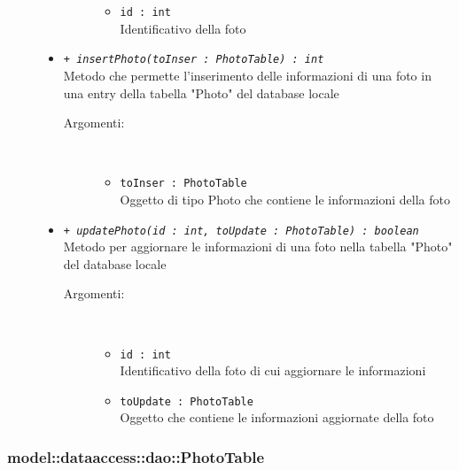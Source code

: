 \documentclass[../DefinizioneDiProdotto.tex]{subfiles}
\begin{document}
\begin{description}
\begin{itemize}
\begin{description}
\begin{itemize}
\item \texttt{id : int}\\
Identificativo della foto\end{itemize}
\end{description}
\item \texttt{+ \textit{insertPhoto(toInser : PhotoTable) : int}}\\
Metodo che permette l'inserimento delle informazioni di una foto in una entry della tabella "Photo" del database locale
 \begin{description}
\item[Argomenti:] \
\begin{itemize}
\item \texttt{toInser : PhotoTable}\\
Oggetto di tipo Photo che contiene le informazioni della foto\end{itemize}
\end{description}
\item \texttt{+ \textit{updatePhoto(id : int, toUpdate : PhotoTable) : boolean}}\\
Metodo per aggiornare le informazioni di una foto nella tabella "Photo" del database locale
 \begin{description}
\item[Argomenti:] \
\begin{itemize}
\item \texttt{id : int}\\
Identificativo della foto di cui aggiornare le informazioni\item \texttt{toUpdate : PhotoTable}\\
Oggetto che contiene le informazioni aggiornate della foto\end{itemize}
\end{description}
\end{itemize}
\end{description}

\subsubsection{model::dataaccess::dao::PhotoTable}
\end{document}
